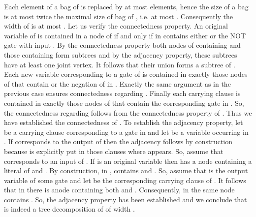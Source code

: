 \documentclass{llncs}
\begin{document}
Each element of a bag of  is replaced by at most  elements, hence the size of a bag
is at most twice the maximal size of bag of , i.e. at most . Consequently the
width of  is at most . Let us verify the connectedness property.
An original variable  of  is contained in a node  of  if and only if
in   contains either  or the NOT gate  with input . By the connectedness property
both nodes of  containing  and those containing  form subtrees and by the adjacency
property, these subtrees have at least one joint vertex. It follows that their union forms a subtree of .
Each new variable  corresponding to a gate  of  is contained in exactly those nodes of 
that contain  or the negation of  in . Exactly the same argument as in the previous case
ensures connectedness regarding . Finally each carrying clause  is contained in exactly those nodes of 
that contain the corresponding gate in . So, the connectedness regarding  follows from the connectedness
property of . Thus we have established the connectedness of .
To establish the adjacency property, let  be a carrying clause corresponding to a gate  in  and 
let  be a variable occurring in . If  corresponds to the output of  then the adjacency follows by
construction because  is explicitly put in those clauses where  appears. So, assume that  corresponds to
an input of . If  is an original variable then  has a node  containing a literal of  and .
By construction, in ,  contains  and . So, assume that  is the output variable of some gate
 and let  be the corresponding carrying clause of . It follows that in  there is anode 
containing both  and . Consequently, in  the same node  contains . So, the adjacency 
property has been established and we conclude that  is indeed a tree decomposition of  of
width .
\end{document}
